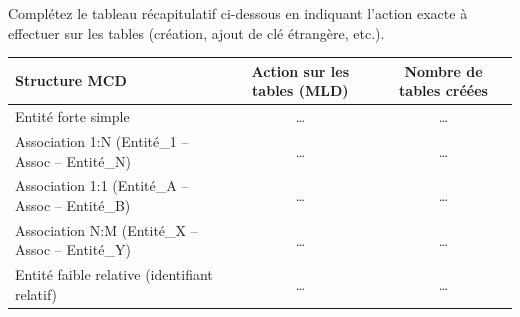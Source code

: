 \documentclass[11pt]{article}
\begin{document}
\begin{exercice}
Complétez le tableau récapitulatif ci-dessous en indiquant l'action exacte à effectuer sur les tables (création, ajout de clé étrangère, etc.).
\begin{center}
\begin{tabular}{|l|c|c|}
\hline
\textbf{Structure MCD} & \textbf{Action sur les tables (MLD)} & \textbf{Nombre de tables créées} \\
\hline
Entité forte simple & \ldots & \ldots \\
\hline
Association 1:N (Entité\_1 -- Assoc -- Entité\_N) & \ldots & \ldots \\
\hline
Association 1:1 (Entité\_A -- Assoc -- Entité\_B) & \ldots & \ldots \\
\hline
Association N:M (Entité\_X -- Assoc -- Entité\_Y) & \ldots & \ldots \\
\hline
Entité faible relative (identifiant relatif) & \ldots & \ldots \\
\hline
\end{tabular}
\end{center}
\end{exercice}
\end{document}
